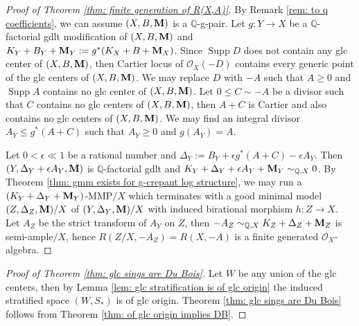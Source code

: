 \documentclass[11pt]{amsart}
\numberwithin{equation}{section}
\newcommand{\Mm}{{\bf{M}}}
\newcommand{\Qq}{\mathbb{Q}}
\newcommand{\Supp}{\operatorname{Supp}}
\newcommand{\Oo}{\mathcal{O}}
\theoremstyle{definition}
\theoremstyle{definition}
\theoremstyle{definition}
\begin{document}
    \begin{proof}[Proof of Theorem \ref{thm: finite generation of R(X,A)}]
      By Remark \ref{rem: to q coefficients}, we can assume
      $(X,B,\Mm)$ is a $\Qq$-g-pair. Let $g: Y\rightarrow X$ be a
      $\mathbb Q$-factorial gdlt modification of $(X,B,\Mm)$ and
      $K_Y+B_Y+\Mm_Y:=g^*(K_X+B+\Mm_X)$. Since $\Supp D$ does not
      contain any glc center of $(X,B,\Mm)$, then Cartier locus of
      $\Oo_X(-D)$ contains every generic point of the glc centers of
      $(X,B,\Mm)$. We may replace $D$ with $-A$ such that $A\ge 0$
      and $\Supp A$ contains no glc center of $(X,B,\Mm)$. Let $0\leq
      C\sim -A$ be a divisor such that $C$ contains no glc centers of
      $(X,B,\Mm)$, then $A+C$ is Cartier and also contains no glc
      centers of $(X,B,\Mm)$. We may find an integral divisor $A_Y\le
      g^*(A+C)$ such that $A_Y\geq 0$ and $g(A_Y)=A$.

      Let $0<\epsilon\ll 1$ be a rational number and
      $\Delta_Y:=B_Y+\epsilon g^*(A+C)-\epsilon A_Y$. Then
      $(Y,\Delta_Y+\epsilon A_Y,\Mm)$ is $\mathbb Q$-factorial gdlt
      and $K_Y+\Delta_Y+\epsilon A_Y+\Mm_Y\sim_{\Qq,X}0$.
      By Theorem \ref{thm: gmm exists for g-crepant log structure},
      we may run a $(K_Y+\Delta_Y+\Mm_Y)$-MMP$/X$ which terminates
      with a good minimal model $(Z,\Delta_Z,\Mm)/X$ of
      $(Y,\Delta_Y,\Mm)/X$ with induced birational morphism $h:
      Z\rightarrow X$. Let $A_Z$ be the strict transform of $A_Y$ on
      $Z$, then $-A_Z\sim_{\Qq,X}K_Z+\Delta_Z+\Mm_Z$ is
      semi-ample$/X$, hence $R(Z/X,-A_Z)=R(X,-A)$ is a finite
      generated $\Oo_X$-algebra.
    \end{proof}

    \begin{proof}[Proof of Theorem \ref{thm: glc sings are Du Bois}]
      Let $W$ be any union of the glc centers, then by Lemma
      \ref{lem: glc stratification is of glc origin} the induced
      stratified space $(W,S_*)$ is of glc origin. Theorem \ref{thm:
      glc sings are Du Bois} follows from Theorem \ref{thm: of glc
      origin implies DB}.
    \end{proof}
\end{document}
